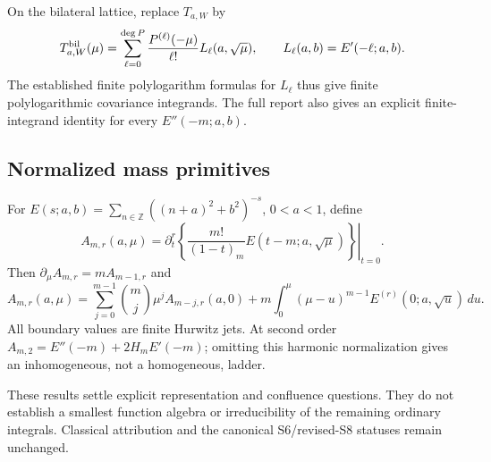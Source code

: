 On the bilateral lattice, replace $T_{a,W}$ by
\[
 T_{a,W}^{\rm bil}(\mu)=\sum_{\ell=0}^{\deg P}
              \frac{P^{(\ell)}(-\mu)}{\ell!}L_\ell(a,\sqrt\mu),
 \qquad L_\ell(a,b)=E'(-\ell;a,b).
\]
The established finite polylogarithm formulas for $L_\ell$ thus give
finite polylogarithmic covariance integrands. The full report also gives
an explicit finite-integrand identity for every $E''(-m;a,b)$.

\subsection{Normalized mass primitives}
For $E(s;a,b)=\sum_{n\in\mathbb Z}((n+a)^2+b^2)^{-s}$, $0<a<1$, define
\[
 A_{m,r}(a,\mu)=\left.\partial_t^r\left\{
                \frac{m!}{(1-t)_m}E(t-m;a,\sqrt\mu)\right\}\right|_{t=0}.
\]
Then $\partial_\mu A_{m,r}=mA_{m-1,r}$ and
\[
 A_{m,r}(a,\mu)=\sum_{j=0}^{m-1}\binom mj\mu^j A_{m-j,r}(a,0)
       +m\int_0^\mu(\mu-u)^{m-1}E^{(r)}(0;a,\sqrt u)\,du.
\]
All boundary values are finite Hurwitz jets. At second order
$A_{m,2}=E''(-m)+2H_mE'(-m)$; omitting this harmonic normalization gives
an inhomogeneous, not a homogeneous, ladder.

These results settle explicit representation and confluence questions.
They do not establish a smallest function algebra or irreducibility of
the remaining ordinary integrals. Classical attribution and the
canonical S6/revised-S8 statuses remain unchanged.
